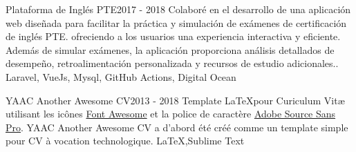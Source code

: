 %
%
%


\begin{projects}
	\project
	{Plataforma de Inglés PTE}{2017 - 2018}
	{  }
	{Colaboré en el desarrollo de una aplicación web diseñada para facilitar la práctica y simulación de exámenes de certificación de inglés PTE. ofreciendo a los usuarios una experiencia interactiva y eficiente. Además de simular exámenes, la aplicación proporciona análisis detallados de desempeño, retroalimentación personalizada y recursos de estudio adicionales..} 
	{Laravel, VueJs, Mysql, GitHub Actions, Digital Ocean}
				
	\project
	{YAAC Another Awesome CV}{2013 - 2018}
	{ }
	{Template \LaTeX pour Curiculum Vitæ utilisant les icônes \href{https://fontawesome.com}{Font Awesome} et la police de caractère \href{https://fonts.google.com/specimen/Source+Sans+Pro}{Adobe Source Sans Pro}. YAAC Another Awesome CV a d'abord été créé comme un template simple pour CV à vocation technologique.}
	{\LaTeX,Sublime Text}

\end{projects}